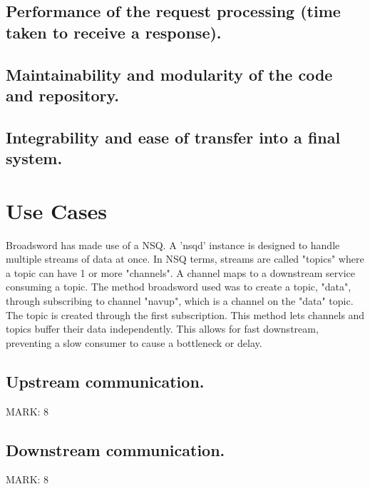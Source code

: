 \documentclass{article}
\begin{document}
\subsection{Performance of the request processing (time taken to receive a response).}

\subsection{Maintainability and modularity of the code and repository.}

\subsection{Integrability and ease of transfer into a final system.}


\section{Use Cases}

Broadsword has made use of a NSQ.
A 'nsqd' instance is designed to handle multiple streams of data at once.
In NSQ terms, streams are called "topics" where a topic can have 1 or more "channels".
A channel maps to a downstream service consuming a topic.
The method broadsword used was to create a topic, "data", through subscribing to channel "navup", which is a channel on the "data" topic. The topic is created through the first subscription.
This method lets channels and topics buffer their data independently. This allows for fast downstream, preventing a slow consumer to cause a bottleneck or delay.

\subsection{Upstream communication.}
\begin{flushleft}MARK: 8\end{flushleft}

\subsection{Downstream communication.}
\begin{flushleft}MARK: 8\end{flushleft}
\end{document}
